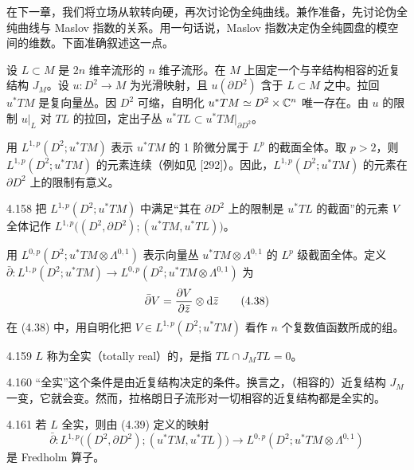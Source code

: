 在下一章，我们将立场从软转向硬，再次讨论伪全纯曲线。兼作准备，先讨论伪全纯曲线与 Maslov 指数的关系。用一句话说，Maslov 指数决定伪全纯圆盘的模空间的维数。下面准确叙述这一点。

设 $L\subset M$ 是 $2n$ 维辛流形的 $n$ 维子流形。在 $M$ 上固定一个与辛结构相容的近复结构 $J_M$。设 $u\colon D^2\to M$ 为光滑映射，且 $u(\partial D^2)$ 含于 $L\subset M$ 之中。拉回 $u^*TM$ 是复向量丛。因 $D^2$ 可缩，自明化 $u^*TM\simeq D^2\times\mathbb{C}^n$ 唯一存在。由 $u$ 的限制 $u|_L$ 对 $TL$ 的拉回，定出子丛 $u^*TL\subset u^*TM|_{\partial D^2}$。

用 $L^{1,p}(D^2;u^*TM)$ 表示 $u^*TM$ 的 1 阶微分属于 $L^p$ 的截面全体。取 $p>2$，则 $L^{1,p}(D^2;u^*TM)$ 的元素连续（例如见 [292]）。因此，$L^{1,p}(D^2;u^*TM)$ 的元素在 $\partial D^2$ 上的限制有意义。

\begin{definition}{4.158}
  把 $L^{1,p}(D^2;u^*TM)$ 中满足“其在 $\partial D^2$ 上的限制是 $u^*TL$ 的截面”的元素 $V$ 全体记作 $L^{1,p}\bigl((D^2,\partial D^2);(u^*TM,u^*TL)\bigr)$。
\end{definition}

用 $L^{0,p}(D^2;u^*TM\otimes\Lambda^{0,1})$ 表示向量丛 $u^*TM\otimes\Lambda^{0,1}$ 的 $L^p$ 级截面全体。定义 $\bar\partial\colon L^{1,p}(D^2;u^*TM)\to L^{0,p}(D^2;u^*TM\otimes\Lambda^{0,1})$ 为
\begin{equation}
  \bar\partial V=\frac{\partial V}{\partial\bar z}\otimes\mathrm{d}\bar z \tag{4.38}
\end{equation}
在 (4.38) 中，用自明化把 $V\in L^{1,p}(D^2;u^*TM)$ 看作 $n$ 个复数值函数所成的组。


\begin{definition}{4.159}
  $L$ 称为全实（totally real）的，是指 $TL\cap J_MTL=0$。
\end{definition}

\begin{remark}{4.160}
  “全实”这个条件是由近复结构决定的条件。换言之，（相容的）近复结构 $J_M$ 一变，它就会变。然而，拉格朗日子流形对一切相容的近复结构都是全实的。
\end{remark}

\begin{theorem}{4.161}
  若 $L$ 全实，则由 (4.39) 定义的映射
  \begin{equation}
    \bar\partial\colon L^{1,p}\bigl((D^2,\partial D^2);(u^*TM,u^*TL)\bigr)\longrightarrow L^{0,p}(D^2;u^*TM\otimes\Lambda^{0,1}) \tag{4.39}
  \end{equation}
  是 Fredholm 算子。
\end{theorem}

